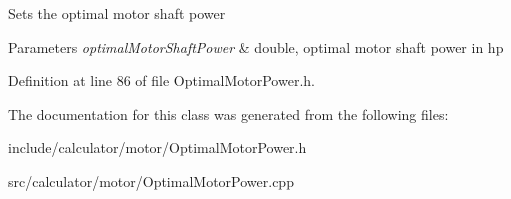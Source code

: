 Sets the optimal motor shaft power


\begin{DoxyParams}{Parameters}
{\em optimal\+Motor\+Shaft\+Power} & double, optimal motor shaft power in hp \\
\hline
\end{DoxyParams}


Definition at line 86 of file Optimal\+Motor\+Power.\+h.



The documentation for this class was generated from the following files\+:\begin{DoxyCompactItemize}
\item 
include/calculator/motor/Optimal\+Motor\+Power.\+h\item 
src/calculator/motor/Optimal\+Motor\+Power.\+cpp\end{DoxyCompactItemize}
